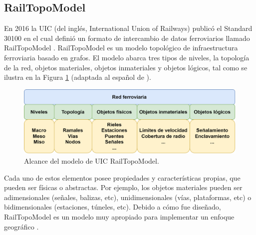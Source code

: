 \subsection{RailTopoModel}

    En 2016 la UIC (del inglés, International Union of Railways) publicó el Standard 30100 \cite{Paper_109} en el cual definió un formato de intercambio de datos ferroviarios llamado RailTopoModel \cite{Paper_11,Paper_146,Paper_149,Paper_150,Paper_200}. RailTopoModel es un modelo topológico de infraestructura ferroviaria basado en grafos. El modelo abarca tres tipos de niveles, la topología de la red, objetos materiales, objetos inmateriales y objetos lógicos, tal como se ilustra en la Figura \ref{fig:RTM_3} (adaptada al español de \cite{Paper_109}). 

    \begin{figure}[H]
        \centering
        \includegraphics[width=1\textwidth]{Figuras/objetos}
        \centering\caption{Alcance del modelo de UIC RailTopoModel.}
        \label{fig:RTM_3}
    \end{figure}

    Cada uno de estos elementos posee propiedades y características propias, que pueden ser físicas o abstractas. Por ejemplo, los objetos materiales pueden ser adimensionales (señales, balizas, etc), unidimensionales (vías, plataformas, etc) o bidimensionales (estaciones, túneles, etc). Debido a cómo fue diseñado, RailTopoModel es un modelo muy apropiado para implementar un enfoque geográfico \cite{Paper_146,Paper_149,Paper_180,Paper_182,Paper_99,Paper_107}.
    





